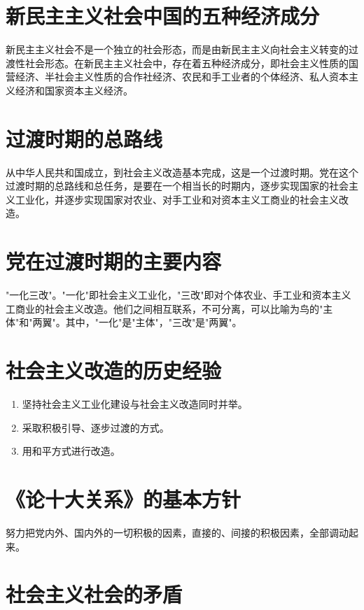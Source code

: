 \documentclass[12pt, a4paper, oneside]{ctexbook}
\begin{document}
\section{新民主主义社会中国的五种经济成分}

新民主主义社会不是一个独立的社会形态，而是由新民主主义向社会主义转变的过渡性社会形态。在新民主主义社会中，存在着五种经济成分，即社会主义性质的国营经济、半社会主义性质的合作社经济、农民和手工业者的个体经济、私人资本主义经济和国家资本主义经济。

\section{过渡时期的总路线}

从中华人民共和国成立，到社会主义改造基本完成，这是一个过渡时期。党在这个过渡时期的总路线和总任务，是要在一个相当长的时期内，逐步实现国家的社会主义工业化，并逐步实现国家对农业、对手工业和对资本主义工商业的社会主义改造。

\section{党在过渡时期的主要内容}

"一化三改"。"一化"即社会主义工业化，"三改"即对个体农业、手工业和资本主义工商业的社会主义改造。他们之间相互联系，不可分离，可以比喻为鸟的"主体"和"两翼"。其中，"一化"是"主体"，"三改"是"两翼"。

\section{社会主义改造的历史经验}

\begin{enumerate}[label=（\arabic*）]
\item 坚持社会主义工业化建设与社会主义改造同时并举。

\item 采取积极引导、逐步过渡的方式。

\item 用和平方式进行改造。
\end{enumerate}

\section{《论十大关系》的基本方针}

努力把党内外、国内外的一切积极的因素，直接的、间接的积极因素，全部调动起来。

\section{社会主义社会的矛盾}
\end{document}
